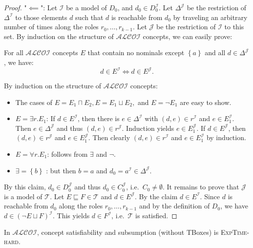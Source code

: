 \begin{proof}
	"$ \impliedby$":
	Let $\mathcal{I}$ be a model of $D_0$, and $d_0 \in D_0^\mathcal{I}$.
	Let $\Delta^\mathcal{J}$ be the restriction of $\Delta^\mathcal{I}$ to those elements $d$ 
	such that $d$ is reachable from $d_0$
	by traveling an arbitrary number of times along the roles $r_0, \ldots, r_{k-1}$.
	Let $ \mathcal{J}$ be the restriction of $\mathcal{I}$ to this set.
	By induction on the structure of $\mathcal{ALCOI}$ concepts, we can easily prove:
	\begin{mdframed}
		For all $\mathcal{ALCOI}$ concepts $E$ that contain no nominals except $\left\{ a \right\}$ 
		and all $d \in \Delta^{\mathcal{J}}$, we have:
		\[
			d \in E^\mathcal{I} \iff d \in E^{\mathcal{J}}
		.\]
	\end{mdframed}
	\begin{subproof}
		By induction on the structure of $\mathcal{ALCOI}$ concepts:
		\begin{itemize}
			\item The cases of $E = E_1 \sqcap E_2, E = E_1 \sqcup E_2,$ and $E = \neg E_1$ are easy to show.
			\item $E = \exists r.E_1$:
				If $d \in E^\mathcal{I}$, then there is $e \in \Delta^\mathcal{I}$ with $(d,e) \in r^\mathcal{I}$ and $e \in E_1^\mathcal{I}$.
				Then $e \in \Delta^\mathcal{J}$ and thus $(d, e) \in r^\mathcal{J}$.
				Induction yields $e \in E_1^\mathcal{J}$.
				If $d \in E^\mathcal{J}$, then $(d,e)\in r^\mathcal{J}$ and $e \in E_1^\mathcal{J}$.
				Then clearly $(d,e) \in r^\mathcal{I}$ and $e \in E_1^\mathcal{I}$ by induction.
			\item $E = \forall r.E_1$: follows from $\exists$ and $\neg$.
				\qedhere
			\item $\exists = \left\{ b \right\}$ : but then $b=a$ and $d_0 = a^\mathcal{I} \in \Delta^\mathcal{J}$.
		\end{itemize}
	\end{subproof}
	By this claim, $d_0 \in D_0^\mathcal{J}$ and thus $d_0 \in C_0^\mathcal{J}$, i.e.\ $C_0 \neq \emptyset$.
	It remains to prove that $\mathcal{J}$ is a model of $\mathcal{T}$.
	Let $E \sqsubseteq F \in \mathcal{T}$ and $d \in E^\mathcal{J}$.
	By the claim $d \in E^\mathcal{I}$.
	Since $d$ is reachable from $d_0$ along the roles $r_0, \ldots, r_{k-1}$
	and by the definition of $D_0$, we have $d \in (\neg E \sqcup F)^\mathcal{I}$.
	This yields $d \in F^\mathcal{I}$, i.e.\ $\mathcal{T}$ is satisfied.
\end{proof}

\begin{theorem}
	In $\mathcal{ALCOI}$, concept satisfiability and subsumption (without TBoxes) is \textsc{ExpTime-hard}.
\end{theorem}

